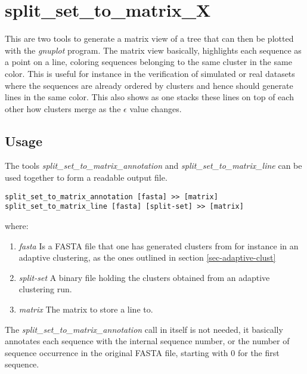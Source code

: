 \section{split\_set\_to\_matrix\_X}

This are two tools to generate a matrix view of a tree that can then be
plotted with the \emph{gnuplot} \cite{gnuplot} program. The matrix
view basically, highlights each sequence as a point on a line,
coloring sequences belonging to the same cluster in the same
color. This is useful for instance in the verification of simulated or
real datasets where the sequences are already ordered by clusters and
hence should generate lines in the same color. This also shows as one
stacks these lines on top of each other how clusters merge as the
$\epsilon$ value changes.

\subsection{Usage}

The tools \emph{split\_set\_to\_matrix\_annotation} and
\emph{split\_set\_to\_matrix\_line} can be used together to form a
readable output file. 

\begin{lstlisting}
split_set_to_matrix_annotation [fasta] >> [matrix]
split_set_to_matrix_line [fasta] [split-set] >> [matrix]
\end{lstlisting}
where:
\begin{enumerate}
  \item \emph{fasta} Is a FASTA file that one has generated clusters
    from for instance in an adaptive clustering, as the ones outlined
    in section \ref{sec-adaptive-clust}
  \item \emph{split-set} A binary file holding the clusters obtained
    from an adaptive clustering run.
  \item \emph{matrix} The matrix to store a line to.
\end{enumerate}
The \emph{split\_set\_to\_matrix\_annotation} call in itself is not
needed, it basically annotates each sequence with the internal
sequence number, or the number of sequence occurrence in the original
FASTA file, starting with 0 for the first sequence.


